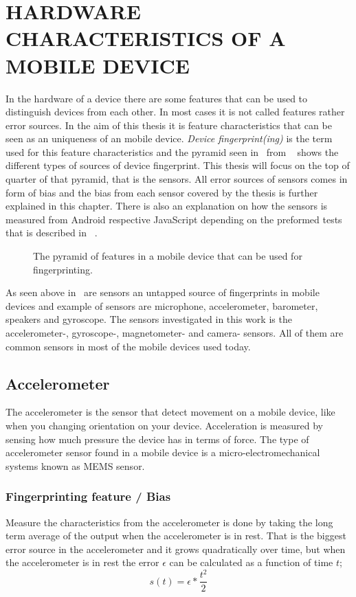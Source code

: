 \chapter{HARDWARE CHARACTERISTICS OF A MOBILE DEVICE}\label{cha:character}
In the hardware of a device there are some features that can be used to distinguish devices from each other. In most cases it is not called features rather error sources. In the aim of this thesis it is feature characteristics that can be seen as an uniqueness of an mobile device. \textit{Device fingerprint(ing)} is the term used for this feature characteristics and the pyramid seen in~ from ~\cite[]{sensor:acoustic} shows the different types of sources of device fingerprint. This thesis will focus on the top of quarter of that pyramid, that is the sensors. All error sources of sensors comes in form of bias and the bias from each sensor covered by the thesis is further explained in this chapter. There is also an explanation on how the sensors is measured from Android respective JavaScript depending on the preformed tests that is described in ~.

\begin{figure}[!h]
	
	\caption{\label{fig:pyramid} The pyramid of features in a mobile device that can be used for fingerprinting.\cite[]{sensor:acoustic}}
\end{figure}

As seen above in~ are sensors an untapped source of fingerprints in mobile devices and example of sensors are microphone, accelerometer, barometer, speakers and gyroscope. The sensors investigated in this work is the accelerometer-, gyroscope-, magnetometer- and camera- sensors. All of them are common sensors in most of the mobile devices used today.


\section{Accelerometer}\label{sec:accelerometer}
The accelerometer is the sensor that detect movement on a mobile device, like when you changing orientation on your device. Acceleration is measured by sensing how much pressure the device has in terms of force. The type of accelerometer sensor found in a mobile device is a micro-electromechanical systems known as MEMS sensor. \cite[]{sensors:fusion}
\subsection{Fingerprinting feature / Bias}
Measure the characteristics from the accelerometer is done by taking the long term average of the output when the accelerometer is in rest. That is the biggest error source in the accelerometer and it grows quadratically over time, but when the accelerometer is in rest the error $\epsilon$ can be calculated as a function of time $t$;
\begin{equation} \label{eq:AccBias}
s(t)=\epsilon * \frac{t^2}{2} 
\end{equation}
\cite[]{sensor:inertialNav}\cite[]{sensors:fusion}


